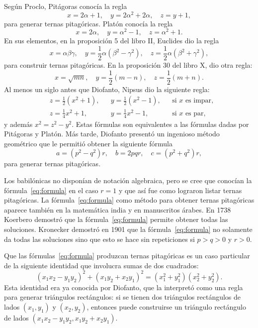 Según Proclo, Pitágoras conocía la regla 
\[
	x=2\alpha+1,\quad
	y=2\alpha^2+2\alpha,\quad
	z=y+1,
\]
para generar ternas pitagóricas. Platón conocía la regla 
\[
	x=2\alpha,\quad
	y=\alpha^2-1,\quad
	z=\alpha^2+1.
\]
En sus elementos, en la proposición 5 del libro II, Euclides dio la regla 
\[
		x=\alpha\beta\gamma,
		\quad
		y=\frac12\alpha(\beta^2-\gamma^2),
		\quad
		z=\frac12\alpha(\beta^2+\gamma^2),
\]
para construir ternas pitagóricas.  En la proposición 30 del libro X, dio otra
regla:
\[
		x=\sqrt{mn},\quad
		y=\frac12(m-n),\quad
		z=\frac12(m+n).
\]
Al menos un siglo antes que Diofanto, Nipsus dio la siguiente regla: 
\begin{align*}
	&z=\frac12(x^2+1), && y=\frac12(x^2-1), &&\text{si $x$ es impar},\\
	&z=\frac14x^2+1, && y=\frac14x^2-1, &&\text{si $x$ es par},
\end{align*}
y además $x^2=z^2-y^2$. Estas fórmulas son equivalentes a las fórmulas dadas
por Pitágoras y Platón. Más tarde, Diofanto presentó un ingenioso método
geométrico que le permitió obtener la siguiente fórmula 
\begin{equation}
	\label{eq:formula}
	a=(p^2-q^2)r,\quad
	b=2pqr,\quad
	c=(p^2+q^2)r,
\end{equation}
para generar ternas pitagóricas. 

Los babilónicas no disponían de notación algebraica, pero se cree que conocían
la fórmula~\eqref{eq:formula} en el caso $r=1$ y que así fue como lograron
listar ternas pitagóricas. La fórmula~\eqref{eq:formula} como método para
obtener ternas pitagóricas aparece también en la matemática india y en
manuscritos árabes. 
En 1738 Koerbero demostró que la fórmula~\eqref{eq:formula} permite obtener
todas las soluciones. Kronecker demostró en 1901 que la
fórmula~\eqref{eq:formula} no solamente da todas las soluciones sino que esto
se hace sin repeticiones si $p>q>0$ y $r>0$. 

Que las fórmulas~\eqref{eq:formula} produzcan ternas pitagóricas es un caso
particular de la siguiente identidad que involucra sumas de dos cuadrados:
\begin{equation}
	\label{eq:2cuadrados}
	(x_1x_2-y_1y_2)^2+(x_1y_2+x_2y_1)^2=(x_1^2+y_1^2)(x_2^2+y_2^2).
\end{equation}
Esta identidad era ya conocida por Diofanto, que la interpretó como una regla
para generar triángulos rectángulos: si se tienen dos triángulos rectángulos de
lados $(x_1,y_1)$ y $(x_2,y_2)$, entonces puede construirse un triángulo
rectángulo de lados $(x_1x_2-y_1y_2, x_1y_2+x_2y_1)$.  

